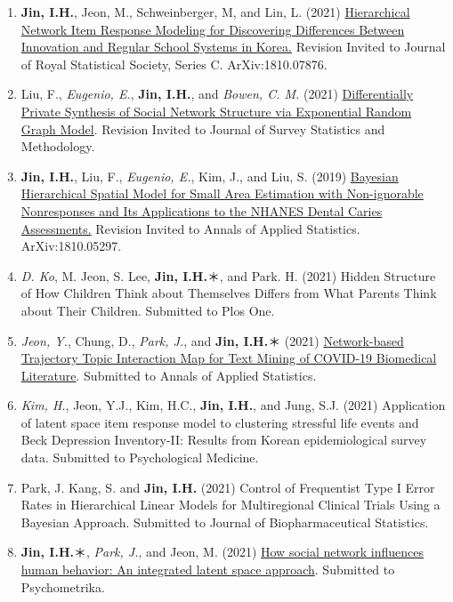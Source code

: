 \documentclass[]{book}
\begin{document}
\begin{enumerate}
\def\labelenumi{\arabic{enumi}.}
\item
  \textbf{Jin, I.H.}, Jeon, M., Schweinberger, M, and Lin, L. (2021) \href{https://arxiv.org/abs/1810.07876}{Hierarchical Network Item Response Modeling for Discovering Differences Between Innovation and Regular School Systems in Korea.} Revision Invited to Journal of Royal Statistical Society, Series C. ArXiv:1810.07876.
\item
  Liu, F., \emph{Eugenio, E.}, \textbf{Jin, I.H.}, and \emph{Bowen, C. M.} (2021) \href{https://www.osti.gov/biblio/1668697}{Differentially Private Synthesis of Social Network Structure via Exponential Random Graph Model}. Revision Invited to Journal of Survey Statistics and Methodology.
\item
  \textbf{Jin, I.H.}, Liu, F., \emph{Eugenio, E.}, Kim, J., and Liu, S. (2019) \href{https://arxiv.org/abs/1810.05297}{Bayesian Hierarchical Spatial Model for Small Area Estimation with Non-ignorable Nonresponses and Its Applications to the NHANES Dental Caries Assessments.} Revision Invited to Annals of Applied Statistics. ArXiv:1810.05297.
\item
  \emph{D. Ko}, M. Jeon, S. Lee, \textbf{Jin, I.H.}＊, and Park. H. (2021) Hidden Structure of How Children Think about Themselves Differs from What Parents Think about Their Children. Submitted to Plos One.
\item
  \emph{Jeon, Y.}, Chung, D., \emph{Park, J.}, and \textbf{Jin, I.H.}＊ (2021) \href{https://arxiv.org/abs/2106.07374}{Network-based Trajectory Topic Interaction Map for Text Mining of COVID-19 Biomedical Literature}. Submitted to Annals of Applied Statistics.
\item
  \emph{Kim, H.}, Jeon, Y.J., Kim, H.C., \textbf{Jin, I.H.}, and Jung, S.J. (2021) Application of latent space item response model to clustering stressful life events and Beck Depression Inventory-II: Results from Korean epidemiological survey data. Submitted to Psychological Medicine.
\item
  Park, J. Kang, S. and \textbf{Jin, I.H.} (2021) Control of Frequentist Type I Error Rates in Hierarchical Linear Models for Multiregional Clinical Trials Using a Bayesian Approach. Submitted to Journal of Biopharmaceutical Statistics.
\item
  \textbf{Jin, I.H.}＊, \emph{Park, J.}, and Jeon, M. (2021) \href{https://arxiv.org/abs/2109.05200}{How social network influences human behavior: An integrated latent space approach}. Submitted to Psychometrika.
\end{enumerate}
\end{document}
